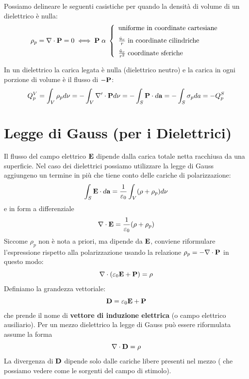 Possiamo delineare le seguenti casistiche per quando la densit\`a di volume di un dielettrico \`e nulla:
\begin{equation*}
	\rho_{p} = \nabla \cdot \bold{P}  = 0 \iff \bold{P} \; \alpha \; \left \{ \begin{array}{l}
		\text{uniforme in coordinate cartesiane} \\ \rule{0pt}{15pt} 
		 \frac{\hat{u}_{r}}{r} \; \text{in coordinate cilindriche } \\ \rule{0pt}{15pt}
		 \frac{\hat{u}_{r}}{r^2} \; \text{coordinate sferiche}
	\end{array}\right.
\end{equation*}

In un dielettrico la carica legata \`e nulla (dielettrico neutro) e la carica in ogni porzione di volume \`e il flusso di $- \bold{P}$:
\begin{equation*}
	Q_{p}^{V} = \int_{V} \rho_{p} d \nu = - \int_{V} \nabla' \cdot \bold{P} d \nu = - \int_{S} \bold{P} \cdot d \bold{a} = - \int_{S} \sigma_{p} da = - Q_{p}^{S}
\end{equation*}

\section{Legge di Gauss (per i Dielettrici)}

Il flusso del campo elettrico $\bold{E}$ dipende dalla carica totale netta racchiusa da una superficie. Nel caso dei dielettrici possiamo utilizzare la legge di Gauss aggiungeno un termine in pi\`u che tiene conto delle cariche di polarizzazione:
\begin{equation*}
	\int_{S} \bold{E} \cdot d\bold{a} = \frac{1}{\varepsilon_0} \int_{V} (\rho + \rho_{p}) d \nu
\end{equation*}
e in form a differenziale 
\begin{equation*}
	\nabla \cdot \bold{E} = \frac{1}{\varepsilon_0} ( \rho + \rho_{p})
\end{equation*}
Siccome $\rho_p$ non \`e nota a priori, ma dipende da $\bold{E}$, conviene riformulare l'espressione rispetto alla polarizzazione usando la relazione $\rho_{p} = - \nabla \cdot \bold{P}$ in questo modo:
\begin{equation*}
	\nabla \cdot (\varepsilon_0 \bold{E} + \bold{P}) = \rho
\end{equation*}
Definiamo la grandezza vettoriale:
\begin{equation}
	\bold{D} = \varepsilon_0 \bold{E} + \bold{P}
\end{equation}
che prende il nome di \textbf{vettore di induzione elettrica} (o campo elettrico ausiliario). Per un mezzo dielettrico la legge di Gauss pu\`o essere riformulata assume la forma 
\begin{equation}
	\nabla \cdot \bold{D} = \rho
\end{equation}
La divergenza di $\bold{D}$ dipende solo dalle cariche libere presenti nel mezzo ( che possiamo vedere come le sorgenti del campo di stimolo).

